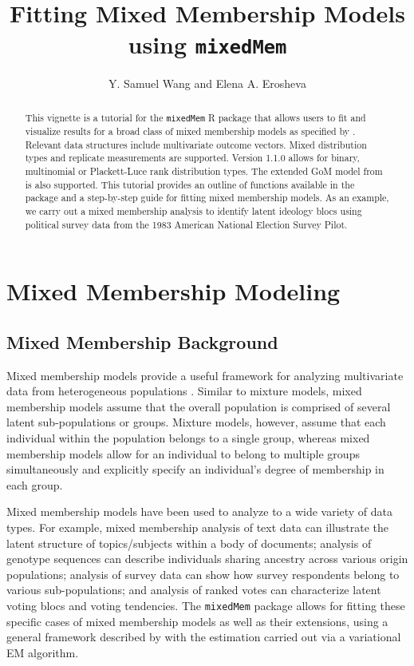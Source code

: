 \documentclass{article}\usepackage[]{graphicx}\usepackage[]{color}
\begin{document}
\title{Fitting Mixed Membership Models using \texttt{mixedMem}}
\author{Y. Samuel Wang and Elena A. Erosheva}
\maketitle

\small
\begin{abstract}
This vignette is a tutorial for the \texttt{mixedMem} R package that allows users to fit and visualize results for a broad class of mixed membership models as specified by \cite{erosheva2004mixed}. Relevant data structures include multivariate outcome vectors. Mixed distribution types and replicate measurements are supported. Version 1.1.0 allows for binary, multinomial or Plackett-Luce rank distribution types. The extended GoM model from \cite{erosheva2007describing} is also supported. This tutorial provides an outline of functions available in the package and a step-by-step guide for fitting mixed membership models. As an example, we carry out a mixed membership analysis to identify latent ideology blocs using political survey data from the 1983 American National Election Survey Pilot.  
\end{abstract}

\normalsize
\section{Mixed Membership Modeling} \label{MMM}
\subsection{Mixed Membership Background}
Mixed membership models provide a useful framework for analyzing multivariate data from heterogeneous populations \citep{Airoldi2014Handbook}. Similar to mixture models, mixed membership models assume that the overall population is comprised of several latent sub-populations or groups. Mixture models, however, assume that each individual within the population belongs to a single group, whereas mixed membership models allow for an individual to belong to multiple groups simultaneously and explicitly specify an individual's degree of membership in each group.

Mixed membership models have been used to analyze to a wide variety of data types. For example, mixed membership analysis of text data \citep{LDA, erosheva2004mixed} can illustrate the latent structure of topics/subjects within a body of documents; analysis of genotype sequences \citep{pritchard2000inference} can describe individuals sharing ancestry across various origin populations; analysis of survey data \citep{erosheva2007describing, grossManriqueVallier} can show how survey respondents belong to various sub-populations; and analysis of ranked votes \citep{gormley2009grade} can characterize latent voting blocs and voting tendencies. The \texttt{mixedMem} package allows for fitting these specific cases of mixed membership models as well as their extensions, using a general framework described by \cite{erosheva2004mixed} with the estimation carried out via a variational EM algorithm.
\end{document}
